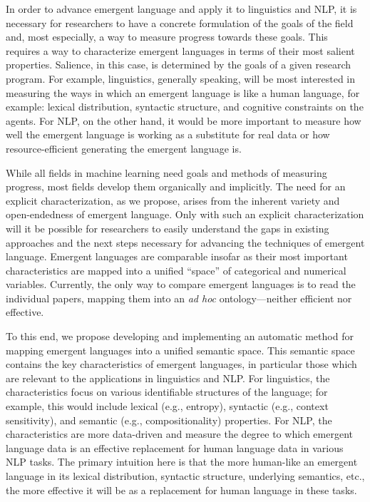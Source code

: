 In order to advance emergent language and apply it to linguistics and NLP, it is necessary for researchers to have a concrete formulation of the goals of the field and, most especially, a way to measure progress towards these goals.
This requires a way to characterize emergent languages in terms of their most salient properties.
Salience, in this case, is determined by the goals of a given research program.
For example, linguistics, generally speaking, will be most interested in measuring the ways in which an emergent language is like a human language, for example: lexical distribution, syntactic structure, and cognitive constraints on the agents.
For NLP, on the other hand, it would be more important to measure how well the emergent language is working as a substitute for real data or how resource-efficient generating the emergent language is.

While all fields in machine learning need goals and methods of measuring progress, most fields develop them organically and implicitly.
The need for an explicit characterization, as we propose, arises from the inherent variety and open-endedness of emergent language.
Only with such an explicit characterization will it be possible for researchers to easily understand the gaps in existing approaches and the next steps necessary for advancing the techniques of emergent language.
Emergent languages are comparable  insofar as their most important characteristics are mapped into a unified ``space'' of categorical and numerical variables.
Currently, the only way to compare emergent languages is to read the individual papers, mapping them into an \emph{ad hoc} ontology---neither efficient nor effective.

To this end, we propose developing and implementing an automatic method for mapping emergent languages  into a unified semantic space.
This semantic space contains the key characteristics of emergent languages, in particular those which are relevant to the applications in linguistics and NLP.\sentspace{}
For linguistics, the characteristics focus on various identifiable structures of the language; for example, this would include lexical (e.g., entropy), syntactic (e.g., context sensitivity), and semantic (e.g., compositionality) properties.
For NLP, the characteristics are more data-driven and measure the degree to which emergent language data is an effective replacement for human language data in various NLP tasks.
The primary intuition here is that the more human-like an emergent language in its lexical distribution, syntactic structure, underlying semantics, etc., the more effective it will be as a replacement for human language in these tasks.


